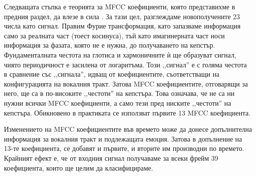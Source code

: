 \documentclass[main.tex]{subfiles}
\begin{document}
    Следващата стъпка е теорията за MFCC коефициенти, която представихме в предния раздел, да влезе в сила . За тази цел, разглеждаме новополучените 23 числа като сигнал.  Правим Фурие трансформация, като запазваме информация само за реалната част (тоест косинуса), тъй като имагинерната част носи информация за фазата, която не е нужна, до получаването на кепстър. Фундаменталната честота на глотиса и хармоничните ѝ ще образуват сигнал, чиято периодичност е засилена от логаритъма. Този ,,сигнал'' е с голяма честота в сравнение със ,,сигнала'', идващ от коефициентите, съответстващи на конфигурацията на вокалния тракт. Затова MFCC коефициентите, отговарящи за него, ще са в по-високите ,,честоти'' на кепстъра.
    Това означава, че не са ни нужни всички MFCC коефициенти, а само тези пред ниските ,,честоти'' на кепстъра. Обикновено в практиката се използват първите 13 MFCC коефициента.

    Изменението на MFCC коефициентите във времето може да донесе допълнителна информация за вокалния тракт и подлежащата емоция. Затова в допълнение на 13-те коефициента, се добавят и първите, и вторите им производни по времето.
    Крайният ефект е, че от входния сигнал получаваме за всеки фрейм 39 коефициента, които ще целим да класифицираме.
\end{document}
